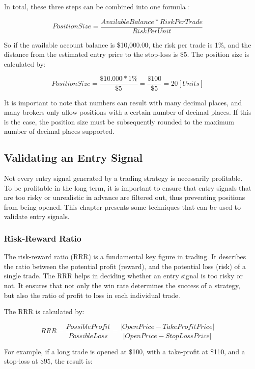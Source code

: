 \noindent
In total, these three steps can be combined into one formula \cite{britannica-position-size}:

\[
    PositionSize = \frac{Available Balance*RiskPerTrade}{RiskPerUnit}
\]

\noindent
So if the available account balance is \$10,000.00, the risk per trade is 1\%, and the distance from the estimated entry price to the stop-loss is \$5.
The position size is calculated by:

\[
    PositionSize = \frac{\$10.000*1\%}{\$5}=\frac{\$100}{\$5}=20 [Units]
\]

\noindent
It is important to note that numbers can result with many decimal places, and many brokers only allow positions with a certain number of decimal places.
If this is the case, the position size must be subsequently rounded to the maximum number of decimal places supported.

\subsection{Validating an Entry Signal}

Not every entry signal generated by a trading strategy is necessarily profitable.
To be profitable in the long term, it is important to ensure that entry signals that are too risky or unrealistic in advance are filtered out, thus preventing positions from being opened.
This chapter presents some techniques that can be used to validate entry signals.

\subsubsection{Risk-Reward Ratio}

The risk-reward ratio (RRR) is a fundamental key figure in trading.
It describes the ratio between the potential profit (reward), and the potential loss (risk) of a single trade.
The RRR helps in deciding whether an entry signal is too risky or not.
It ensures that not only the win rate determines the success of a strategy, but also the ratio of profit to loss in each individual trade.

The RRR is calculated by:

\[
    RRR = \frac{PossibleProfit}{PossibleLoss} = \frac{|OpenPrice - TakeProfitPrice|}{|OpenPrice - StopLossPrice|}
\]

\noindent
For example, if a long trade is opened at \$100, with a take-profit at \$110, and a stop-loss at \$95, the result is:

